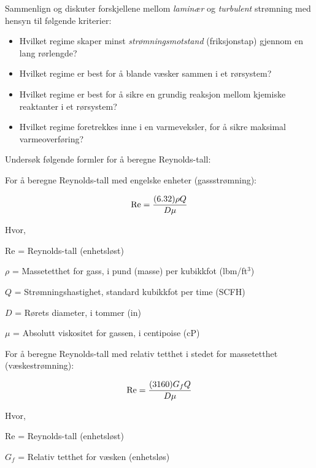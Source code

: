 

\noindent
Sammenlign og diskuter forskjellene mellom {\it laminær} og {\it turbulent} strømning med hensyn til følgende kriterier:

\vskip 10pt

\begin{itemize}
\item{} Hvilket regime skaper minst {\it strømningsmotstand} (friksjonstap) gjennom en lang rørlengde? 
\vskip 10pt
\item{} Hvilket regime er best for å blande væsker sammen i et rørsystem?
\vskip 10pt
\item{} Hvilket regime er best for å sikre en grundig reaksjon mellom kjemiske reaktanter i et rørsystem?
\vskip 10pt
\item{} Hvilket regime foretrekkes inne i en varmeveksler, for å sikre maksimal varmeoverføring?
\end{itemize}

\vskip 30pt

\noindent
Undersøk følgende formler for å beregne Reynolds-tall:

\vskip 10pt

For å beregne Reynolds-tall med engelske enheter (gassstrømning):

$$\hbox{Re} = {{(6.32) \rho Q} \over {D \mu}}$$

\noindent
Hvor,

Re = Reynolds-tall (enhetsløst)

$\rho$ = Massetetthet for gass, i pund (masse) per kubikkfot (lbm/ft$^{3}$)

$Q$ = Strømningshastighet, standard kubikkfot per time (SCFH)

$D$ = Rørets diameter, i tommer (in)

$\mu$ = Absolutt viskositet for gassen, i centipoise (cP)

\vskip 20pt \goodbreak

For å beregne Reynolds-tall med relativ tetthet i stedet for massetetthet (væskestrømning):

$$\hbox{Re} = {{(3160) G_f Q} \over {D \mu}}$$

\noindent
Hvor,

Re = Reynolds-tall (enhetsløst)

$G_f$ = Relativ tetthet for væsken (enhetsløs)

